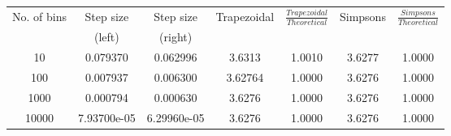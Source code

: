 \begin{center}
\begin{longtable}{|c|c|c|c|c|c|c|}
\hline
No. of bins & Step size & Step size & Trapezoidal & $\frac{Trapezoidal}{Theoretical}$ & Simpsons & $\frac{Simpsons}{Theoretical}$ \\
 & (left) & (right) & & & & \\ 
\hline
\hline
10 & 0.079370 & 0.062996 & 3.6313 & 1.0010 & 3.6277 & 1.0000 \\
\hline
100 & 0.007937 & 0.006300 & 3.62764 & 1.0000 & \cellcolor{codegreen}3.6276 & 1.0000 \\
\hline
1000 & 0.000794 & 0.000630 & \cellcolor{codegreen}3.6276 & 1.0000 & \cellcolor{codegreen}3.6276 & 1.0000 \\
\hline
10000 & 7.93700e-05 & 6.29960e-05 & \cellcolor{codegreen}3.6276 & 1.0000 & \cellcolor{codegreen}3.6276 & 1.0000 \\
\hline
\hline
\end{longtable}
\end{center}

